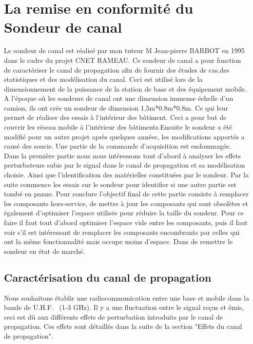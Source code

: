 \chapter{La remise en conformité du Sondeur de canal}

Le sondeur de canal est réalisé par mon tuteur M Jean-pierre BARBOT en 1995 dans le cadre du projet CNET RAMEAU. Ce sondeur de canal a pour fonction de caractériser le canal de propagation afin de fournir des études de cas,des statistiques et des modélisation du canal. Ceci est utilisé lors de la dimensionnement de la puissance de la station de base et des équipement mobile. A l'époque où les sondeurs de canal ont une dimension immense échelle d'un camion, ils ont crée un sondeur de dimension 1,5m*0.8m*0.8m. Ce qui leur permet de réaliser des essais à l'intérieur des bâtiment. Ceci a pour but de couvrir les réseau mobile à l'intérieur des bâtiments.Ensuite le sondeur a été modifié pour un autre projet après quelques années, les modifications apportés a causé des soucis. Une partie de la commande d'acquisition est endommagée.  \\

Dans la première partie nous nous intéressons tout d'abord à analyser les effets perturbateurs subis par le signal dans le canal de propagation et sa modélisation choisie. Ainsi que l'identification des matérielles constituées par le sondeur. Par la suite commence les essais sur le sondeur pour identifier si une autre partie est tombé en panne. Pour conclure l'objectif final de cette partie consiste à remplacer les composants hors-service, de mettre à jour les composants qui sont obsolètes et également d'optimiser l'espace utilisée pour réduire la taille du sondeur. Pour ce faire il faut tout d'abord optimiser l'espace vide entre les composants, puis il faut voir s'il est intéressant de remplacer les composants encombrants par celles qui ont la même fonctionnalité mais occupe moins d'espace. Dans de remettre le sondeur en état de marché.

\section{Caractérisation du canal de propagation}

Nous souhaitons établir une radiocommunication entre une base et mobile dans la bande de U.H.F.      \ (1-3 GHz). Il y a une fluctuation entre le signal reçus et émis, ceci est dû aux différents effets de perturbation introduits par le canal de propagation. Ces effets sont détaillés dans la suite de la section "Effets du canal de propagation".\\ 
\newpage
